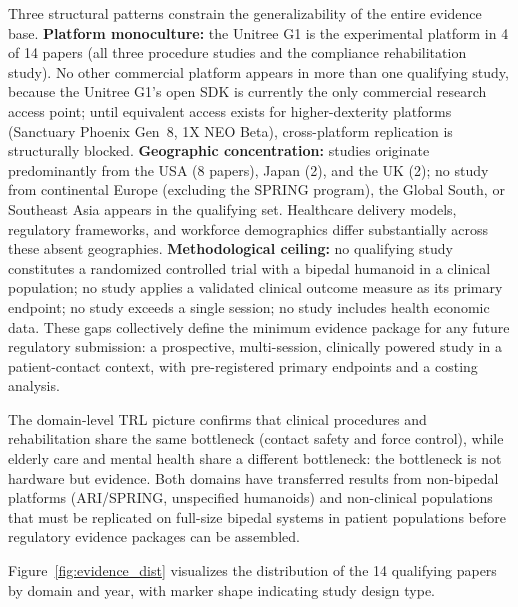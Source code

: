 \documentclass[acmjour]{acmart}
\begin{document}
Three structural patterns constrain the generalizability of the entire evidence
base. \textbf{Platform monoculture:} the Unitree G1 is the experimental platform
in 4 of 14 papers (all three procedure studies and the compliance rehabilitation
study). No other commercial platform appears in more than one qualifying study,
because the Unitree G1's open SDK is currently the only commercial research
access point; until equivalent access exists for higher-dexterity platforms
(Sanctuary Phoenix Gen~8, 1X NEO Beta), cross-platform replication is
structurally blocked. \textbf{Geographic concentration:} studies originate
predominantly from the USA (8 papers), Japan (2), and the UK (2); no study from
continental Europe (excluding the SPRING program), the Global South, or Southeast
Asia appears in the qualifying set. Healthcare delivery models, regulatory
frameworks, and workforce demographics differ substantially across these absent
geographies. \textbf{Methodological ceiling:} no qualifying study constitutes a
randomized controlled trial with a bipedal humanoid in a clinical population; no
study applies a validated clinical outcome measure as its primary endpoint; no
study exceeds a single session; no study includes health economic data. These
gaps collectively define the minimum evidence package for any future regulatory
submission: a prospective, multi-session, clinically powered study in a
patient-contact context, with pre-registered primary endpoints and a costing
analysis.

The domain-level TRL picture confirms that clinical procedures and rehabilitation
share the same bottleneck (contact safety and force control), while elderly
care and mental health share a different bottleneck: the bottleneck is not
hardware but evidence. Both domains have transferred results from non-bipedal
platforms (ARI/SPRING, unspecified humanoids) and non-clinical populations that
must be replicated on full-size bipedal systems in patient populations before
regulatory evidence packages can be assembled.

Figure~\ref{fig:evidence_dist} visualizes the distribution of the 14 qualifying
papers by domain and year, with marker shape indicating study design type.
\end{document}
